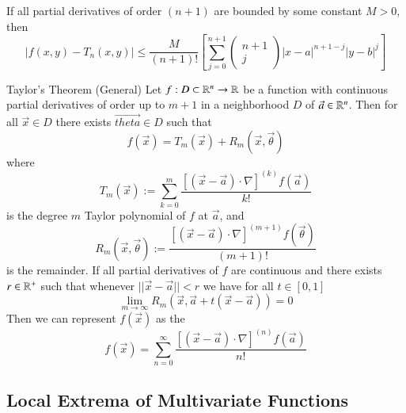 \documentclass[12pt]{report}
\begin{document}
\begin{appendices}
    \begin{rmk}
        If all partial derivatives of order $(n+1)$ are bounded by some constant $M > 0$, then \begin{equation}
            |f(x,y) - T_n(x,y)| \leq \frac{M}{(n+1)!}\left[\sum\limits_{j=0}^{n+1}\begin{pmatrix} n + 1 \\ j \end{pmatrix}|x-a|^{n+1-j}|y-b|^j\right]
        \end{equation}
    \end{rmk}
    
    
    \begin{namthm}{Taylor's Theorem (General)}
        Let $f:D\subset\mathbb R^n \rightarrow \mathbb R$ be a function with continuous partial derivatives of order up to $m+1$ in a neighborhood $D$ of $\vec{a} \in \mathbb R^n$. Then for all $\vec{x} \in D$ there exists $\vec{theta} \in D$ such that \begin{equation}
            f(\vec{x}) = T_m(\vec{x}) + R_m(\vec{x},\vec{\theta})
        \end{equation}
        where \begin{equation}
            T_m(\vec{x}) := \sum\limits_{k=0}^m\frac{\left[(\vec{x} - \vec{a})\cdot \nabla\right]^{(k)}f(\vec{a})}{k!}
        \end{equation}
        is the degree $m$ Taylor polynomial of $f$ at $\vec{a}$, and \begin{equation}
            R_m(\vec{x}, \vec{\theta}) := \frac{\left[(\vec{x} - \vec{a})\cdot \nabla\right]^{(m+1)}f(\vec{\theta})}{(m+1)!}
        \end{equation}
        is the remainder. If all partial derivatives of $f$ are continuous and there exists $r \in \mathbb R^{+}$ such that whenever $||\vec{x} - \vec{a}|| < r$ we have for all $t \in [0,1]$ \begin{equation}
            \lim_{m\rightarrow \infty} R_m(\vec{x}, \vec{a}+t(\vec{x} - \vec{a})) = 0
        \end{equation}
        Then we can represent $f(\vec{x})$ as the  \begin{equation}
            f(\vec{x}) = \sum\limits_{n = 0}^{\infty}\frac{\left[(\vec{x} - \vec{a})\cdot \nabla\right]^{(n)}f(\vec{a})}{n!}
        \end{equation}
    \end{namthm}
    
    \subsection{Local Extrema of Multivariate Functions}
    

\end{appendices}
\end{document}
